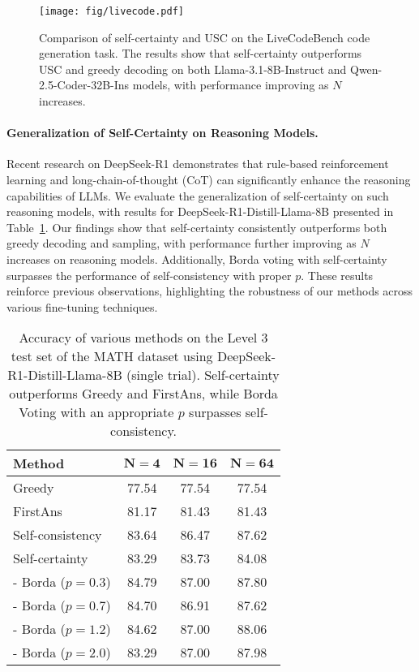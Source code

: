 \begin{figure}[t]
    \centering
    \texttt{[image: fig/livecode.pdf]}
    \caption{Comparison of self-certainty and USC on the LiveCodeBench code generation task. The results show that self-certainty outperforms USC and greedy decoding on both Llama-3.1-8B-Instruct and Qwen-2.5-Coder-32B-Ins models, with performance improving as \(N\) increases.}
    \label{fig:livecode}
\end{figure}

\paragraph{Generalization of Self-Certainty on Reasoning Models.}
Recent research on DeepSeek-R1 \citep{guo2025deepseek} demonstrates that rule-based reinforcement learning and long-chain-of-thought (CoT) can significantly enhance the reasoning capabilities of LLMs. We evaluate the generalization of self-certainty on such reasoning models, with results for DeepSeek-R1-Distill-Llama-8B presented in Table~\ref{tab:distill}. Our findings show that self-certainty consistently outperforms both greedy decoding and sampling, with performance further improving as $N$ increases on reasoning models. Additionally, Borda voting with self-certainty surpasses the performance of self-consistency with proper \(p\). These results reinforce previous observations, highlighting the robustness of our methods across various fine-tuning techniques.

\begin{table}[t]
\centering
\caption{Accuracy of various methods on the Level 3 test set of the MATH dataset using DeepSeek-R1-Distill-Llama-8B (single trial). Self-certainty outperforms Greedy and FirstAns, while Borda Voting with an appropriate \(p\) surpasses self-consistency.}
\label{tab:distill}
\vspace{0.5em}
\small
\begin{tabular}{@{}lccc@{}}
\toprule
\textbf{Method} & \textbf{\(\boldsymbol{N = 4}\)} & \textbf{\(\boldsymbol{N = 16} \)} & \textbf{\(\boldsymbol{N = 64}\)} \\
\midrule
Greedy    & 77.54  &  77.54 & 77.54 \\
FirstAns            & 81.17    & 81.43 & 81.43\\
\midrule
Self-consistency    & 83.64    & 86.47 & 87.62\\
\midrule
Self-certainty      & 83.29 & 83.73 & 84.08  \\
- Borda ($p=0.3$)   & 84.79  & 87.00 & 87.80  \\
- Borda ($p=0.7$)   & 84.70 & 86.91  & 87.62\\
- Borda ($p=1.2$)   & 84.62  & 87.00 & 88.06\\
- Borda ($p=2.0$)   & 83.29  & 87.00 & 87.98\\
\bottomrule
\end{tabular}
\vspace{-1em}
\end{table}

